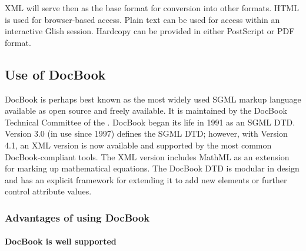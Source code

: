 \noindent XML will serve then as the base format for conversion into
other formats.  HTML is used for browser-based access.  Plain text can
be used for access within an interactive Glish session.  Hardcopy can
be provided in either PostScript or PDF format.  

\subsection{Use of DocBook} 

DocBook is perhaps best known as the most widely used SGML markup
language available as open source and freely available.  It is
maintained by the DocBook Technical Committee of the
.  DocBook
began its life in 1991 as an SGML DTD.  
Version 3.0 (in use since 1997) defines the SGML DTD; however, with
Version 4.1, an XML version is now available and supported by the most
common DocBook-compliant tools.  The XML version includes MathML as an
extension for marking up mathematical equations.  The DocBook DTD is
modular in design and has an explicit framework for extending it to
add new elements or further control attribute values.   

\subsubsection{Advantages of using DocBook}

\paragraph{DocBook is well supported}

